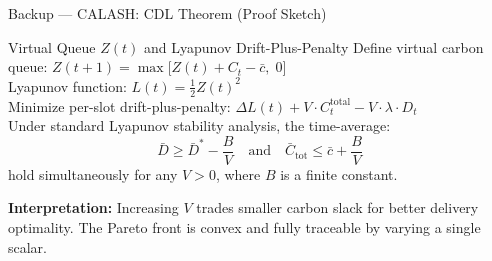 \documentclass[aspectratio=169, 11pt]{beamer}
\begin{document}
\appendix

\begin{frame}[label=backup-calash]{Backup — CALASH: CDL Theorem (Proof Sketch)}

  \begin{block}{Virtual Queue $Z(t)$ and Lyapunov Drift-Plus-Penalty}
    \vspace{2pt}
    Define virtual carbon queue:
    $Z(t+1) = \max\bigl[Z(t) + C_t - \bar{c},\; 0\bigr]$\\
    Lyapunov function: $L(t) = \tfrac{1}{2}Z(t)^2$\\[4pt]
    Minimize per-slot drift-plus-penalty:
    $\Delta L(t) + V \cdot C_t^{\mathrm{total}} - V \cdot \lambda \cdot D_t$\\[4pt]
    Under standard Lyapunov stability analysis, the time-average:
    \[
      \bar{D} \geq \bar{D}^* - \frac{B}{V}
      \quad\text{and}\quad
      \bar{C}_{\mathrm{tot}} \leq \bar{c} + \frac{B}{V}
    \]
    hold simultaneously for any $V > 0$, where $B$ is a finite constant.
    \vspace{2pt}
  \end{block}

  \textbf{Interpretation:} Increasing $V$ trades smaller carbon slack for better delivery optimality. The Pareto front is convex and fully traceable by varying a single scalar.

\end{frame}
\end{document}
